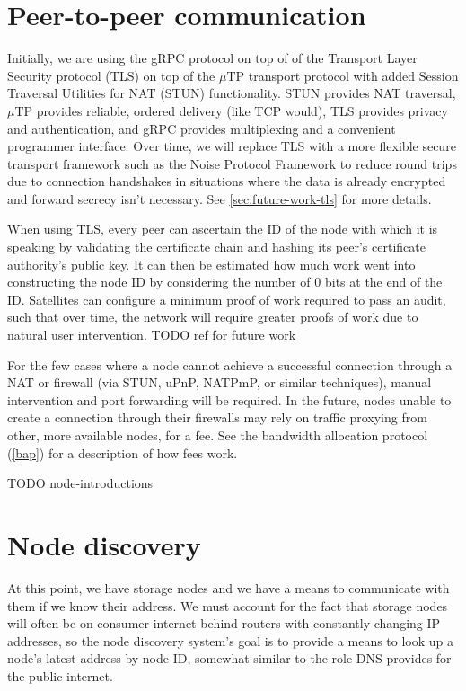 \documentclass[11pt,fleqn,openany]{book}
\newcommand{\todo}[1]{{\color{red} TODO #1 }}
\begin{document}
\section{Peer-to-peer communication}

Initially, we are using the gRPC \cite{grpc} protocol on top of of the
Transport Layer Security protocol (TLS) on top of the $\mu$TP
\cite{utp} transport protocol with added Session Traversal Utilities for NAT
(STUN) functionality. STUN provides NAT traversal, $\mu$TP provides reliable,
ordered delivery (like TCP would), TLS provides privacy and authentication,
and gRPC provides multiplexing and a convenient programmer interface.
Over time, we will replace TLS with a more flexible secure transport
framework such as the Noise Protocol Framework \cite{noise-proto} to
reduce round trips due to connection handshakes in situations where the data is
already encrypted and forward secrecy isn't necessary. See
\ref{sec:future-work-tls} for more details.

When using TLS, every peer can ascertain the ID of the node with which it is
speaking by validating the certificate chain and hashing its peer's
certificate authority's public key. It can then be estimated how much work went
into constructing the node ID by considering the number of 0 bits at the end of
the ID. Satellites can configure a minimum proof of work required to pass an
audit, such that over time, the network will require greater proofs of work
due to natural user intervention. \todo{ref for future work}

For the few cases where a node cannot achieve a successful connection through a
NAT or firewall (via STUN, uPnP, NATPmP, or similar techniques), manual
intervention and port forwarding will be required. In the future, nodes unable
to create a connection through their firewalls may rely on traffic proxying from
other, more available nodes, for a fee. See the bandwidth allocation protocol
(\ref{bap}) for a description of how fees work.

\todo{node-introductions}

\section{Node discovery}\label{sec:concrete-node-discovery}

At this point, we have storage nodes and we have a means to communicate with
them if we know their address. We must account for the fact that storage nodes
will often be on consumer internet behind routers with constantly changing IP
addresses, so the node discovery system's goal is to provide a means to look
up a node's latest address by node ID, somewhat similar to the role DNS
provides for the public internet.
\end{document}
